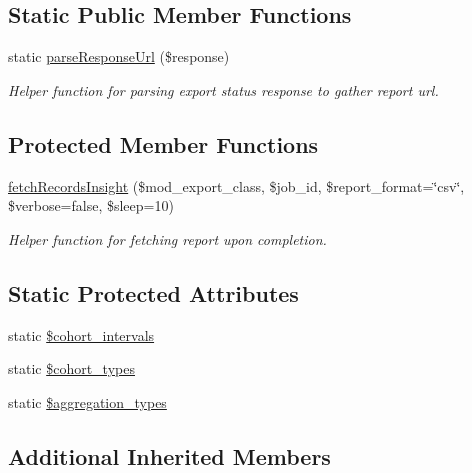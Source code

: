 \subsection*{Static Public Member Functions}
\begin{DoxyCompactItemize}
\item 
static \hyperlink{classTune_1_1Management_1_1Reports_1_1ReportsInsightBase_a8af44833abc5829a74168bec5cdb5dc7}{parse\-Response\-Url} (\$response)
\begin{DoxyCompactList}\small\item\em Helper function for parsing export status response to gather report url. \end{DoxyCompactList}\end{DoxyCompactItemize}
\subsection*{Protected Member Functions}
\begin{DoxyCompactItemize}
\item 
\hyperlink{classTune_1_1Management_1_1Reports_1_1ReportsInsightBase_a0de324106185ce1477111745f84c4a85}{fetch\-Records\-Insight} (\$mod\-\_\-export\-\_\-class, \$job\-\_\-id, \$report\-\_\-format=\char`\"{}csv\char`\"{}, \$verbose=false, \$sleep=10)
\begin{DoxyCompactList}\small\item\em Helper function for fetching report upon completion. \end{DoxyCompactList}\end{DoxyCompactItemize}
\subsection*{Static Protected Attributes}
\begin{DoxyCompactItemize}
\item 
static \hyperlink{classTune_1_1Management_1_1Reports_1_1ReportsInsightBase_a4b54d97ffa0b522f9ab30425fc595ba7}{\$cohort\-\_\-intervals}
\item 
static \hyperlink{classTune_1_1Management_1_1Reports_1_1ReportsInsightBase_a1d7559051fef0f083d7d33ae18aaa6d6}{\$cohort\-\_\-types}
\item 
static \hyperlink{classTune_1_1Management_1_1Reports_1_1ReportsInsightBase_a4c40a9cd27f07ec535e6c51bad40e845}{\$aggregation\-\_\-types}
\end{DoxyCompactItemize}
\subsection*{Additional Inherited Members}


